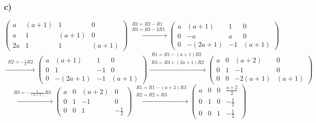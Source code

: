 \documentclass[11pt]{article}
\begin{document}
\subsubsection*{c)}
\[
 \left(
\begin{array}{ccc|c}
a & (a+1) & 1 & 0 \\
a & 1 & (a+1) & 0 \\
2a & 1 & 1 & (a+1)
\end{array}
\right)
\overset{\begin{matrix}
  R2 = R2-R1 \\
  R3 = R3-2R1
 \end{matrix}}{\rightarrow}
 \left(
\begin{array}{ccc|c}
a & (a+1) & 1 & 0 \\
0 & -a & a & 0 \\
0 & -(2a+1) & -1 & (a+1)
\end{array}
\right)
\]
\[
\overset{\begin{matrix}
  R2 = -\frac{1}{a}R2
 \end{matrix}}{\rightarrow}
 \left(
\begin{array}{ccc|c}
a & (a+1) & 1 & 0 \\
0 & 1 & -1 & 0 \\
0 & -(2a+1) & -1 & (a+1)
\end{array}
\right)
\overset{\begin{matrix}
	R1=R1-(a+1)R2\\
	R3=R3+(2a+1)R2
 \end{matrix}}{\rightarrow}
 \left(
\begin{array}{ccc|c}
a & 0 & (a+2) & 0 \\
0 & 1 & -1 & 0 \\
0 & 0 & -2(a+1) & (a+1)
\end{array}
\right)
\]
\[
\overset{\begin{matrix}
	R3=-\frac{2}{(a+1)}R3
 \end{matrix}}{\rightarrow}
 \left(
\begin{array}{ccc|c}
a & 0 & (a+2) & 0 \\
0 & 1 & -1 & 0 \\
0 & 0 & 1 & -\frac{1}{2}
\end{array}
\right)
\overset{\begin{matrix}
	R1=R1-(a+2)R3\\
	R2=R2+R3
 \end{matrix}}{\rightarrow}
 \left(
\begin{array}{ccc|c}
a & 0 & 0 & \frac{a+2}{2} \\
0 & 1 & 0 & -\frac{1}{2} \\
0 & 0 & 1 & -\frac{1}{2}
\end{array}
\right)
\]
\end{document}
